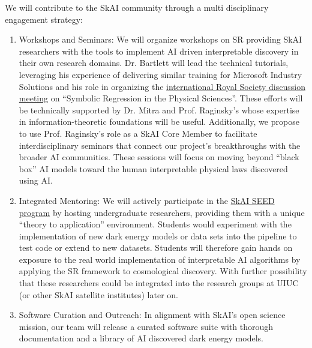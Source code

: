 \documentclass[11pt]{article}
\begin{document}
%
\engagement
We will contribute to the SkAI community through a multi disciplinary engagement strategy:
\begin{enumerate}[
    topsep=0pt,
    partopsep=0pt,
    parsep=0pt,
    itemsep=0pt,]
    \item  Workshops and Seminars: We will organize workshops on SR providing SkAI researchers with the tools to implement AI driven interpretable discovery in their own research domains.  Dr. Bartlett will lead the technical tutorials, leveraging his experience of delivering similar training for Microsoft Industry Solutions and his role in organizing the \href{https://royalsociety.org/science-events-and-lectures/2025/04/symbolic-regression/}{international Royal Society discussion meeting} on ``Symbolic Regression in the Physical Sciences''. These efforts will be technically supported by Dr. Mitra and Prof. Raginsky’s whose expertise in information-theoretic foundations will be useful. Additionally, we propose to use Prof. Raginsky's  role as a SkAI Core Member to facilitate interdisciplinary seminars that connect our project’s breakthroughs with the broader  AI communities. These sessions will focus on moving beyond ``black box'' AI models toward the human interpretable physical laws discovered using AI.
    \item Integrated Mentoring: We will actively participate in the \href{https://skai-institute.org/education/educational-programs/}{SkAI SEED program} by hosting undergraduate researchers, providing them with a unique ``theory to application'' environment. Students would experiment with the implementation of new dark energy models or data sets into the pipeline to test code or extend
    to new datasets. Students will therefore gain hands on exposure to the real world implementation of interpretable AI algorithms by applying the SR  framework to cosmological discovery. With further possibility that these researchers could be integrated into the research groups at UIUC (or other SkAI satellite institutes) later on.  
    \item Software Curation and Outreach: In alignment with SkAI’s open science mission, our team will release a curated software suite with thorough documentation and a library of AI discovered dark energy models.
\end{enumerate}
\end{document}
